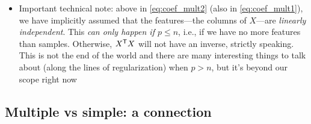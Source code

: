 \documentclass{article}
\begin{document}
\begin{itemize}
\item Important technical note: above in \eqref{eq:coef_mult2} (also in
  \eqref{eq:coef_mult1}), we have implicitly assumed that the features---the 
  columns of $X$---are \emph{linearly independent}. This \emph{can only happen
    if $p \leq n$}, i.e., if we have no more features than samples. Otherwise,
  $X^{\mathsf{T}} X$ will not have an inverse, strictly speaking. This is not the end of
  the world and there are many interesting things to talk about (along the lines
  of regularization) when $p > n$, but it's beyond our scope right now
\end{itemize}

\subsection{Multiple vs simple: a connection}
\end{document}
